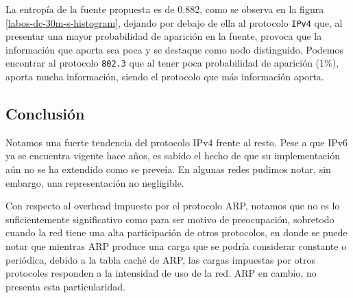 \documentclass[final,inline,a4paper,narroweqnarray]{ieee}
\let\Oldsubsection\subsection
\renewcommand{\subsection}{\FloatBarrier\Oldsubsection}
\begin{document}
  La entropía de la fuente propuesta es de 0.882, como se observa en la
  figura \ref{labos-dc-30m-s-histogram}, dejando por debajo de ella al
  protocolo \texttt{IPv4} que, al presentar una mayor probabilidad de
  aparición en la fuente, provoca que la información que aporta sea
  poca y se destaque como nodo distinguido. Podemos encontrar al protocolo 
  \texttt{802.3} que al tener poca probabilidad de aparición
  (1\%), aporta mucha información, siendo el protocolo que más información
  aporta.

    \subsection{Conclusión}

    Notamos una fuerte tendencia del protocolo IPv4 frente al resto. Pese a que IPv6 ya se encuentra vigente hace años, es sabido el hecho de que su implementación aún no se ha extendido como se preveía. En algunas redes pudimos notar, sin embargo, una representación no negligible.

    Con respecto al overhead impuesto por el protocolo ARP, notamos que no es lo suficientemente significativo como para ser motivo de preocupación, sobretodo cuando la red tiene una alta participación de otros protocolos, en donde se puede notar que mientras ARP produce una carga que se podría considerar constante o periódica, debido a la tabla caché de ARP, las cargas impuestas por otros protocoles responden a la intensidad de uso de la red. ARP en cambio, no presenta esta particularidad.




\end{document}
